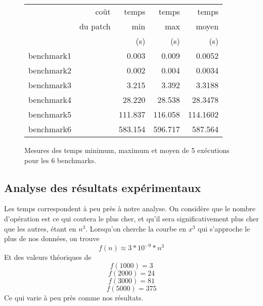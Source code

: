 \documentclass[a4paper, 10pt, french]{article}
\begin{document}
    \begin{figure}[h]
      \begin{center}
        \begin{tabular}{|l||r||r|r|r||}
          \hline
          \hline
            & coût         & temps     & temps   & temps \\
            & du patch     & min       & max     & moyen \\
	    &		   & (s)       & (s)     & (s)   \\
          \hline
          \hline
            benchmark1 &      &  0.003   &  0.009   &   0.0052  \\
          \hline
            benchmark2 &      &   0.002  &   0.004  &   0.0034  \\
          \hline
            benchmark3 &      &  3.215   &  3.392   &    3.3188 \\
          \hline
            benchmark4 &      &  28.220   &  28.538   &   28.3478  \\
          \hline
            benchmark5 &      &   111.837  & 116.058    &   114.1602  \\
          \hline
            benchmark6 &      &  583.154   &  596.717   &    587.564 \\
          \hline
          \hline
        \end{tabular}
        \caption{Mesures des temps minimum, maximum et moyen de 5 exécutions pour les 6 benchmarks.}
        \label{table-temps}
      \end{center}
    \end{figure}

\subsection{Analyse des résultats expérimentaux}
Les temps correspondent à peu près à notre analyse. On considère que le nombre d'opération est ce qui coutera le plus cher, et qu'il sera significativement plus cher que les autres, étant en $n^3$. Lorsqu'on cherche la courbe en $x^3$ qui s'approche le plus de nos données, on trouve $$f(n) \approx 3*10^{-9}*n^3$$
Et des valeurs théoriques de
$$ f(1000) = 3$$ $$ f(2000) = 24 $$$$f(3000) = 81$$$$f(5000) = 375$$
Ce qui varie à peu près comme nos résultats.
\end{document}
